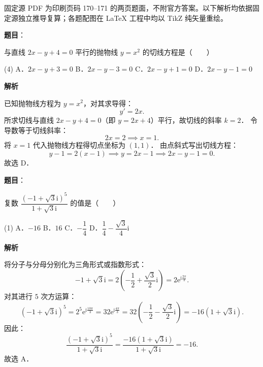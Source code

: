 

\begin{gktip}
固定源 PDF 为印刷页码 170–171 的两页题面，不附官方答案。以下解析均依据固定源独立推导复算；各题配图在 LaTeX 工程中均以 TikZ 纯矢量重绘。
\end{gktip}

\begin{answer}

\textbf{题目}：

与直线 $2x - y + 4 = 0$ 平行的抛物线 $y = x^2$ 的切线方程是\mbox{（　　）}

\begin{gkopts}(4)
\task A．$2x - y + 3 = 0$
\task B．$2x - y - 3 = 0$
\task C．$2x - y + 1 = 0$
\task D．$2x - y - 1 = 0$
\end{gkopts}

\textbf{解析}

已知抛物线方程为 $y = x^2$，对其求导得：
\nopagebreak[4]
\[
y' = 2x.
\]
所求切线与直线 $2x - y + 4 = 0$（即 $y = 2x + 4$）平行，故切线的斜率 $k = 2$．
令导数等于切线斜率：
\nopagebreak[4]
\[
2x = 2 \implies x = 1.
\]
将 $x = 1$ 代入抛物线方程得切点坐标为 $(1, 1)$．
由点斜式写出切线方程：
\nopagebreak[4]
\[
y - 1 = 2(x - 1) \implies y = 2x - 1 \implies 2x - y - 1 = 0.
\]
故选 D．


\end{answer}
\begin{answer}

\textbf{题目}：

复数 $\dfrac{(-1 + \sqrt{3}\mathrm{i})^5}{1 + \sqrt{3}\mathrm{i}}$ 的值是\mbox{（　　）}

\begin{gkopts}(1)
\task A．$-16$
\task B．$16$
\task C．$-\dfrac{1}{4}$
\task D．$\dfrac{1}{4} - \dfrac{\sqrt{3}}{4}\mathrm{i}$
\end{gkopts}

\textbf{解析}

将分子与分母分别化为三角形式或指数形式：
\nopagebreak[4]
\[
-1 + \sqrt{3}\mathrm{i} = 2\left(-\frac{1}{2} + \frac{\sqrt{3}}{2}\mathrm{i}\right) = 2\mathrm{e}^{\mathrm{i}\frac{2\pi}{3}}.
\]
对其进行 $5$ 次方运算：
\nopagebreak[4]
\[
(-1 + \sqrt{3}\mathrm{i})^5 = 2^5 \mathrm{e}^{\mathrm{i}\frac{10\pi}{3}} = 32 \mathrm{e}^{\mathrm{i}\frac{4\pi}{3}} = 32\left(-\frac{1}{2} - \frac{\sqrt{3}}{2}\mathrm{i}\right) = -16(1 + \sqrt{3}\mathrm{i}).
\]
因此：
\nopagebreak[4]
\[
\frac{(-1 + \sqrt{3}\mathrm{i})^5}{1 + \sqrt{3}\mathrm{i}} = \frac{-16(1 + \sqrt{3}\mathrm{i})}{1 + \sqrt{3}\mathrm{i}} = -16.
\]
故选 A．


\end{answer}
